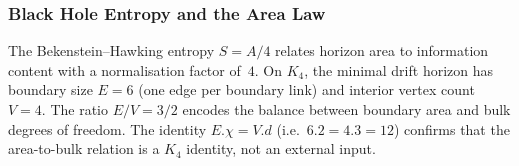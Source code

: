 \documentclass[11pt,a4paper]{book}
\def\cdot{.}%
\begin{document}
\subsubsection*{Black Hole Entropy and the Area Law}

The Bekenstein--Hawking entropy $S = A / 4$ relates horizon area to
information content with a normalisation factor of~$4$.  On $K_4$,
the minimal drift horizon has boundary size $E = 6$ (one edge per
boundary link) and interior vertex count $V = 4$.  The ratio
$E / V = 3/2$ encodes the balance between boundary area and bulk
degrees of freedom.  The identity $E \cdot \chi = V \cdot d$ (i.e.\
$6 \cdot 2 = 4 \cdot 3 = 12$) confirms that the area-to-bulk
relation is a $K_4$ identity, not an external input.
\end{document}
